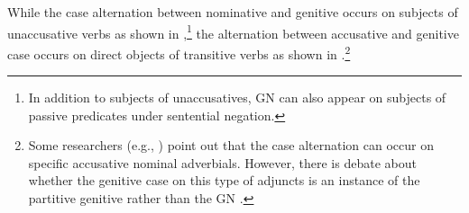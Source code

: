 \documentclass[output=paper]{langscibook}
\begin{document}
While the case alternation between nominative and genitive occurs on subjects of unaccusative verbs as shown in ,\footnote{In addition to subjects of unaccusatives, GN can also appear on subjects of passive predicates under sentential negation.
}
the alternation between accusative and genitive case occurs on direct objects of transitive verbs as shown in .\footnote{Some researchers (e.g., \citealp{Peskovskij1956,Pesetsky1982,Franks1995,Borovikoff1997,Szucsich2001,Bailyn2012}) point out that the case alternation can occur on specific accusative nominal adverbials.
However, there is debate about whether the genitive case on this type of adjuncts is an instance of the partitive genitive \citep[see][]{Franks.Dziwirek1993} rather than the GN \citep[see][]{Borovikoff1997,Pereltsvaig2000}.
}
\end{document}
